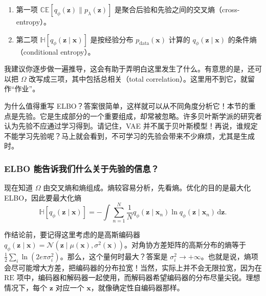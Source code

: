 
\begin{enumerate}[label=(\roman*)]
\item 第一项 $\mathbb{CE}[q_\phi(\mathbf{z})\|p_\lambda(\mathbf{z})]$ 是聚合后验和先验之间的交叉熵（cross-entropy）。
\item 第二项 $\mathbb{H}[q_\phi(\mathbf{z}\mid\mathbf{x})]$ 是按经验分布 $p_{\mathrm{data}}(\mathbf{x})$ 计算的 $q_\phi(\mathbf{z}\mid\mathbf{x})$ 的条件熵（conditional entropy）。
\end{enumerate}

我建议你逐步做一遍推导，这会有助于弄明白这里发生了什么。有意思的是，还可以把 $\Omega$ 改写成三项，其中包括总相关（total correlation）。这里用不到它，就留作“作业”。

为什么值得重写 ELBO？答案很简单，这样就可以从不同角度分析它！本节的重点是先验。它是生成部分的一个重要组成，却常被忽略。许多贝叶斯学派的研究者认为先验不应通过学习得到。请记住，VAE 并不属于贝叶斯模型！再说，谁规定不能学习先验呢？马上就会看到，不可学习的先验会带来不少麻烦，尤其是生成时。

\subsubsection{ELBO 能告诉我们什么关于先验的信息？}
现在知道 $\Omega$ 由交叉熵和熵组成。熵较容易分析，先看熵。优化的目的是最大化 ELBO，因此要最大化熵
\begin{equation}
\mathbb{H}[q_\phi(\mathbf{z}\mid\mathbf{x})]
 =-\int\sum_{n=1}^N\frac{1}{N}
    q_\phi(\mathbf{z}\mid\mathbf{x}_n)\ln q_\phi(\mathbf{z}\mid\mathbf{x}_n)\,\mathrm{d}\mathbf{z}.
\tag{5.45}\label{eq:05-45}
\end{equation}

作结论前，要记得这里考虑的是高斯编码器 $q_\phi(\mathbf{z}\mid\mathbf{x})=\mathcal{N}(\mathbf{z}\mid\mu(\mathbf{x}),\sigma^2(\mathbf{x}))$。对角协方差矩阵的高斯分布的熵等于 $\frac12\sum_i\ln(2e\pi\sigma_i^2)$。那么，这个量何时最大？答案是 $\sigma_i^2\to+\infty$。也就是说，熵项会尽可能增大方差，把编码器的分布拉宽！当然，实际上并不会无限拉宽，因为在 $\mathrm{RE}$ 项中，编码器和解码器一起使用，而解码器希望编码器的分布尽量尖锐。理想情况下，每个 $\mathbf{z}$ 对应一个 $\mathbf{x}$，就像确定性自编码器那样。

